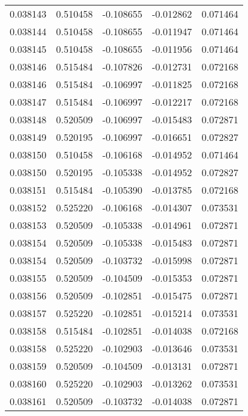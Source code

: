 \begin{tabular}{lrrrr}
0.038143    &  0.510458 & -0.108655 & -0.012862 &             0.071464 \\
0.038144    &  0.510458 & -0.108655 & -0.011947 &             0.071464 \\
0.038145    &  0.510458 & -0.108655 & -0.011956 &             0.071464 \\
0.038146    &  0.515484 & -0.107826 & -0.012731 &             0.072168 \\
0.038146    &  0.515484 & -0.106997 & -0.011825 &             0.072168 \\
0.038147    &  0.515484 & -0.106997 & -0.012217 &             0.072168 \\
0.038148    &  0.520509 & -0.106997 & -0.015483 &             0.072871 \\
0.038149    &  0.520195 & -0.106997 & -0.016651 &             0.072827 \\
0.038150    &  0.510458 & -0.106168 & -0.014952 &             0.071464 \\
0.038150    &  0.520195 & -0.105338 & -0.014952 &             0.072827 \\
0.038151    &  0.515484 & -0.105390 & -0.013785 &             0.072168 \\
0.038152    &  0.525220 & -0.106168 & -0.014307 &             0.073531 \\
0.038153    &  0.520509 & -0.105338 & -0.014961 &             0.072871 \\
0.038154    &  0.520509 & -0.105338 & -0.015483 &             0.072871 \\
0.038154    &  0.520509 & -0.103732 & -0.015998 &             0.072871 \\
0.038155    &  0.520509 & -0.104509 & -0.015353 &             0.072871 \\
0.038156    &  0.520509 & -0.102851 & -0.015475 &             0.072871 \\
0.038157    &  0.525220 & -0.102851 & -0.015214 &             0.073531 \\
0.038158    &  0.515484 & -0.102851 & -0.014038 &             0.072168 \\
0.038158    &  0.525220 & -0.102903 & -0.013646 &             0.073531 \\
0.038159    &  0.520509 & -0.104509 & -0.013131 &             0.072871 \\
0.038160    &  0.525220 & -0.102903 & -0.013262 &             0.073531 \\
0.038161    &  0.520509 & -0.103732 & -0.014038 &             0.072871 \\

\end{tabular}
